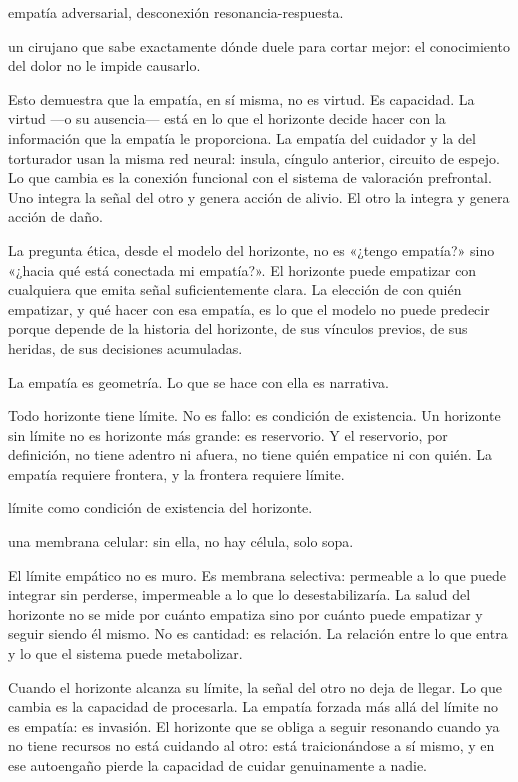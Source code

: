 \begin{fisica}
 empatía adversarial, desconexión resonancia-respuesta.

 un cirujano que sabe exactamente dónde duele para cortar mejor: el conocimiento del dolor no le impide causarlo.
\end{fisica}
Esto demuestra que la empatía, en sí misma, no es virtud. Es capacidad. La virtud —o su ausencia— está en lo que el horizonte decide hacer con la información que la empatía le proporciona. La empatía del cuidador y la del torturador usan la misma red neural: insula, cíngulo anterior, circuito de espejo. Lo que cambia es la conexión funcional con el sistema de valoración prefrontal. Uno integra la señal del otro y genera acción de alivio. El otro la integra y genera acción de daño.

La pregunta ética, desde el modelo del horizonte, no es «¿tengo empatía?» sino «¿hacia qué está conectada mi empatía?». El horizonte puede empatizar con cualquiera que emita señal suficientemente clara. La elección de con quién empatizar, y qué hacer con esa empatía, es lo que el modelo no puede predecir porque depende de la historia del horizonte, de sus vínculos previos, de sus heridas, de sus decisiones acumuladas.

La empatía es geometría. Lo que se hace con ella es narrativa.

\noindent Todo horizonte tiene límite. No es fallo: es condición de existencia. Un horizonte sin límite no es horizonte más grande: es reservorio. Y el reservorio, por definición, no tiene adentro ni afuera, no tiene quién empatice ni con quién. La empatía requiere frontera, y la frontera requiere límite.

\begin{fisica}
 límite como condición de existencia del horizonte.

 una membrana celular: sin ella, no hay célula, solo sopa.
\end{fisica}
El límite empático no es muro. Es membrana selectiva: permeable a lo que puede integrar sin perderse, impermeable a lo que lo desestabilizaría. La salud del horizonte no se mide por cuánto empatiza sino por cuánto puede empatizar y seguir siendo él mismo. No es cantidad: es relación. La relación entre lo que entra y lo que el sistema puede metabolizar.

Cuando el horizonte alcanza su límite, la señal del otro no deja de llegar. Lo que cambia es la capacidad de procesarla. La empatía forzada más allá del límite no es empatía: es invasión. El horizonte que se obliga a seguir resonando cuando ya no tiene recursos no está cuidando al otro: está traicionándose a sí mismo, y en ese autoengaño pierde la capacidad de cuidar genuinamente a nadie.

